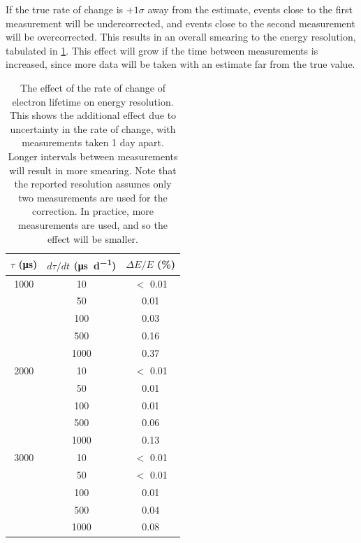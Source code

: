\documentclass[herrin-thesis.tex]{subfiles}
\begin{document}
If the true rate of change is \(+1\sigma\) away from the estimate, events close to the first measurement will be undercorrected, and events close to the second measurement will be overcorrected. This results in an overall smearing to the energy resolution, tabulated in \cref{tab:el_res_dtaudt}. This effect will grow if the time between measurements is increased, since more data will be taken with an estimate far from the true value.

\begin{table}[htd]
\centering
\begin{tabular}{c|c|c}
	\(\tau\) (\si{\micro\second})	&	\(d\tau/dt\) (\si{\micro\second\per\day})	&	\(\Delta E / E\) (\%) 	\\ \hline
	1000					&	10			&	\(<\) 0.01			\\
						&	50			&	0.01				\\
						&	100			&	0.03				\\
						&	500			&	0.16				\\
						&	1000			&	0.37				\\ \hline
	2000					&	10			&	\(<\) 0.01			\\
						&	50			&	0.01				\\
						&	100			&	0.01				\\
						&	500			&	0.06				\\
						&	1000			&	0.13				\\ \hline
	3000					&	10			&	\(<\) 0.01			\\
						&	50			&	\(<\) 0.01			\\
						&	100			&	0.01				\\
						&	500			&	0.04				\\
						&	1000			&	0.08
\end{tabular}
\caption[Electron lifetime time variance effect on resolution]{The effect of the rate of change of electron lifetime on energy resolution. This shows the additional effect due to uncertainty in the rate of change, with measurements taken 1 day apart. Longer intervals between measurements will result in more smearing. Note that the reported resolution assumes only two measurements are used for the correction. In practice, more measurements are used, and so the effect will be smaller.}
\label{tab:el_res_dtaudt}
\end{table}
\end{document}
